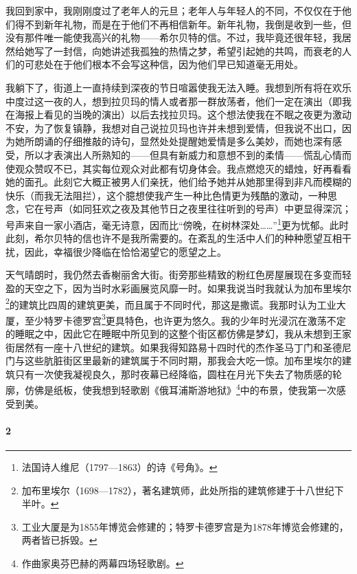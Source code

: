 \par 我回到家中，我刚刚度过了老年人的元旦；老年人与年轻人的不同，不仅仅在于他们得不到新年礼物，而是在于他们不再相信新年。新年礼物，我倒是收到一些，但没有那件唯一能使我高兴的礼物——希尔贝特的信。不过，我毕竟还很年轻，我居然给她写了一封信，向她讲述我孤独的热情之梦，希望引起她的共鸣，而衰老的人们的可悲处在于他们根本不会写这种信，因为他们早已知道毫无用处。
\par 我躺下了，街道上一直持续到深夜的节日喧嚣使我无法入睡。我想到所有将在欢乐中度过这一夜的人，想到拉贝玛的情人或者那一群放荡者，他们一定在演出（即我在海报上看见的当晚的演出）以后去找拉贝玛。这个想法使我在不眠之夜更为激动不安，为了恢复镇静，我想对自己说拉贝玛也许并未想到爱情，但我说不出口，因为她所朗诵的仔细推敲的诗句，显然处处提醒她爱情是多么美妙，而她也深有感受，所以才表演出人所熟知的——但具有新威力和意想不到的柔情——慌乱心情而使观众赞叹不已，其实每位观众对此都有切身体会。我点燃熄灭的蜡烛，好再看看她的面孔。此刻它大概正被男人们亲抚，他们给予她并从她那里得到非凡而模糊的快乐（而我无法阻拦），这个臆想使我产生一种比色情更为残酷的激动，一种思念，它在号声（如同狂欢之夜及其他节日之夜里往往听到的号声）中更显得深沉；号声来自一家小酒店，毫无诗意，因而比“傍晚，在树林深处……”\footnote{法国诗人维尼（1797—1863）的诗《号角》。}更为忧郁。此时此刻，希尔贝特的信也许不是我所需要的。在紊乱的生活中人们的种种愿望互相干扰，因此，幸福很少降临在恰恰渴望它的愿望之上。
\par 天气晴朗时，我仍然去香榭丽舍大街。街旁那些精致的粉红色房屋展现在多变而轻盈的天空之下，因为当时水彩画展览风靡一时。如果我说当时我就认为加布里埃尔\footnote{加布里埃尔（1698—1782），著名建筑师，此处所指的建筑修建于十八世纪下半叶。}的建筑比四周的建筑更美，而且属于不同时代，那这是撒谎。我那时认为工业大厦，至少特罗卡德罗宫\footnote{工业大厦是为1855年博览会修建的；特罗卡德罗宫是为1878年博览会修建的，两者皆已拆毁。}更具特色，也许更为悠久。我的少年时光浸沉在激荡不定的睡眠之中，因此它在睡眠中所见到的这整个街区都仿佛是梦幻，我从未想到王家街居然有一座十八世纪的建筑。如果我得知路易十四时代的杰作圣马丁门和圣德尼门与这些肮脏街区里最新的建筑属于不同时期，那我会大吃一惊。加布里埃尔的建筑只有一次使我凝视良久，那时夜幕已经降临，圆柱在月光下失去了物质感的轮廓，仿佛是纸板，使我想到轻歌剧《俄耳浦斯游地狱》\footnote{作曲家奥芬巴赫的两幕四场轻歌剧。}中的布景，使我第一次感受到美。



\paragraph*{2}

